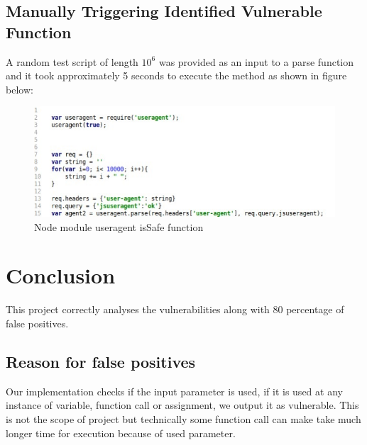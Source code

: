 \documentclass[authoryear,preprint]{sigplanconf}
\begin{document}
\subsection{Manually Triggering Identified Vulnerable Function}

A random test script of length  \begin{math}10^{6} \end{math} was provided as an input to a parse function and it took approximately 5 seconds to execute the method as shown in figure below:

\begin{figure}[ht]
\centering
\includegraphics[width=1\linewidth]{figures/useragent-manual-invoking}
\caption[Node module useragent isSafe function]{\label{f:invoking}Node module useragent isSafe function}
\end{figure}

\section{Conclusion}

This project correctly analyses the vulnerabilities along with 80 percentage of false positives.

\subsection{Reason for false positives}
Our implementation checks if the input parameter is used, if it is used at any instance of variable, function call or assignment, we output it as vulnerable. This is not the scope of project but technically some function call can make take much longer time for execution because of used parameter.
\end{document}
